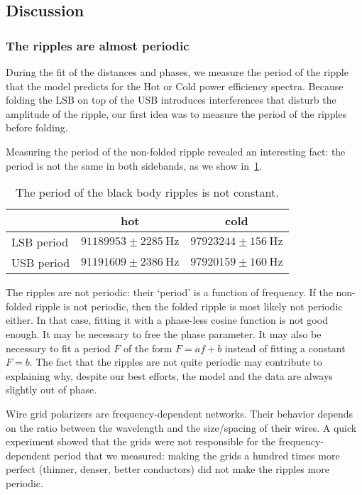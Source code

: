 \subsection{Discussion}

\subsubsection{The ripples are almost periodic}
During the fit of the distances and phases, we measure the period of the ripple that the model predicts for the Hot or Cold power efficiency spectra.
Because folding the LSB on top of the USB introduces interferences that disturb the amplitude of the ripple, our first idea was to measure the period of the ripples before folding.

Measuring the period of the non-folded ripple revealed an interesting fact:
the period is not the same in both sidebands, as we show in~\cref{tab:pseudoperiodic}.

\begin{table}[hbtp]
    \centering
    \begin{tabular}{l c c}
        \toprule
        & hot & cold \\
        \midrule
        LSB period & $\num{91189953}\pm\SI{2285}{\hertz}$ & $\num{97923244}\pm\SI{156}{\hertz}$
        \\
        USB period & $\num{91191609}\pm\SI{2386}{\hertz}$ & $\num{97920159}\pm\SI{160}{\hertz}$
        \\
        \bottomrule
    \end{tabular}
    \caption{The period of the black body ripples is not constant.}
    \label{tab:pseudoperiodic}
\end{table}

The ripples are not periodic: their `period' is a function of frequency.
If the non-folded ripple is not periodic, then the folded ripple is most likely not periodic either.
In that case, fitting it with a phase-less cosine function is not good enough.
It may be necessary to free the phase parameter.
It may also be necessary to fit a period $F$ of the form $F = a f + b$ instead of fitting a constant $F=b$.
The fact that the ripples are not quite periodic may contribute to explaining why, despite our best efforts, the model and the data are always slightly out of phase.

Wire grid polarizers are frequency-dependent networks.
Their behavior depends on the ratio between the wavelength and the size/spacing of their wires.
A quick experiment showed that the grids were not responsible for the frequency-dependent period that we measured:
making the grids a hundred times more perfect (thinner, denser, better conductors) did not make the ripples more periodic.

